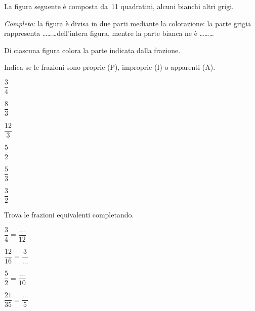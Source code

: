 \begin{esercizio}
 \label{ese:3.3}
La figura seguente è composta da~11 quadratini, alcuni bianchi altri grigi.
\begin{center}
 
\end{center}
\emph{Completa}: la figura è divisa in due parti mediante la colorazione: 
la parte grigia
rappresenta \ldots\ldots\ldots dell'intera figura, mentre la parte bianca 
ne è \ldots\ldots\ldots
\end{esercizio}

\begin{esercizio}
 \label{ese:3.4}
 Di ciascuna figura colora la parte indicata dalla frazione.
\begin{center}
 
\end{center}
\end{esercizio}

\begin{esercizio}
\label{ese:3.5}
 Indica se le frazioni sono proprie (P), improprie (I) o apparenti (A).
 \begin{multicols}{3}
 \TabPositions{0.6cm}
 \begin{enumeratea}
 \item \(\dfrac{3}{4}\) \tab\quad\boxP\quad\boxI\quad\boxA\vspace{1.1ex}
 \item \(\dfrac{8}{3}\) \tab\quad\boxP\quad\boxI\quad\boxA
 \item \(\dfrac{12}{3}\) \tab\quad\boxP\quad\boxI\quad\boxA\vspace{1.1ex}
 \item \(\dfrac{5}{2}\) \tab\quad\boxP\quad\boxI\quad\boxA
 \item \(\dfrac{5}{3}\) \tab\quad\boxP\quad\boxI\quad\boxA\vspace{1.1ex}
 \item \(\dfrac{3}{2}\) \tab\quad\boxP\quad\boxI\quad\boxA
 \end{enumeratea}
 \end{multicols}
\end{esercizio}

\begin{esercizio}
\label{ese:3.6}
Trova le frazioni equivalenti completando.
 \begin{multicols}{4}
 \begin{enumeratea}
 	\item \(\dfrac{3}{4}=\dfrac{\ldots}{12}\)
 	\item \(\dfrac{12}{16}=\dfrac{3}{\ldots}\)
 	\item \(\dfrac{5}{2}=\dfrac{\ldots}{10}\)
 	\item \(\dfrac{21}{35}=\dfrac{\ldots}{5}\)
 \end{enumeratea}
 \end{multicols}
\end{esercizio}

